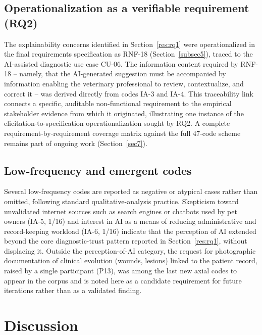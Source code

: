 \documentclass[pdflatex,sn-mathphys-num,Numbered]{sn-jnl}
\begin{document}
\subsection{Operationalization as a verifiable requirement (RQ2)}\label{res:rq2}

The explainability concerns identified in Section~\ref{res:rq1} were operationalized in the final requirements specification as RNF-18 (Section~\ref{subsec5}), traced to the AI-assisted diagnostic use case CU-06. The information content required by RNF-18 -- namely, that the AI-generated suggestion must be accompanied by information enabling the veterinary professional to review, contextualize, and correct it -- was derived directly from codes IA-3 and IA-4. This traceability link connects a specific, auditable non-functional requirement to the empirical stakeholder evidence from which it originated, illustrating one instance of the elicitation-to-specification operationalization sought by RQ2. A complete requirement-by-requirement coverage matrix against the full 47-code scheme remains part of ongoing work (Section~\ref{sec7}).

\subsection{Low-frequency and emergent codes}\label{res:emergent}

Several low-frequency codes are reported as negative or atypical cases rather than omitted, following standard qualitative-analysis practice. Skepticism toward unvalidated internet sources such as search engines or chatbots used by pet owners (IA-5, 1/16) and interest in AI as a means of reducing administrative and record-keeping workload (IA-6, 1/16) indicate that the perception of AI extended beyond the core diagnostic-trust pattern reported in Section~\ref{res:rq1}, without displacing it. Outside the perception-of-AI category, the request for photographic documentation of clinical evolution (wounds, lesions) linked to the patient record, raised by a single participant (P13), was among the last new axial codes to appear in the corpus and is noted here as a candidate requirement for future iterations rather than as a validated finding.


\section{Discussion}\label{sec5}
\end{document}
